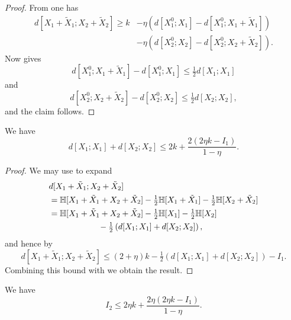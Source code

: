 \begin{proof}\leanok From  one has
\begin{align*}
    d[X_1+\tilde X_1; X_2+\tilde X_2] \geq k &- \eta(d[X^0_1;X_1] - d[X^0_1;X_1+\tilde X_1]) \\
    &- \eta(d[X^0_2;X_2] - d[X^0_2;X_2+\tilde X_2]).
\end{align*}
Now  gives
$$
d[X^0_1;X_1+\tilde X_1] - d[X^0_1;X_1] \leq \tfrac{1}{2} d[X_1;X_1]$$
and
$$
  d[X^0_2;X_2+\tilde X_2] - d[X^0_2;X_2] \leq \tfrac{1}{2} d[X_2;X_2],
$$
and the claim follows.
\end{proof}

\begin{lemma}\label{second-estimate-aux}\leanok
We have
\[d[X_1;X_1] + d[X_2;X_2] \leq 2 k + \frac{2(2 \eta k - I_1)}{1-\eta}. \]
\end{lemma}
\begin{proof}
\leanok
We may use  to expand
  \begin{align*}
   & d[X_1+\tilde X_1;X_2+\tilde X_2] \\ &= \mathbb{H}[X_1+\tilde X_1 + X_2 + \tilde X_2]  - \tfrac{1}{2} \mathbb{H}[X_1+\tilde X_1] - \tfrac{1}{2} \mathbb{H}[X_2+\tilde X_2] \\
    &= \mathbb{H}[X_1+\tilde X_1 + X_2 + \tilde X_2]  - \tfrac{1}{2} \mathbb{H}[X_1] - \tfrac{1}{2} \mathbb{H}[X_2]  \\ & \qquad\qquad\qquad   - \tfrac{1}{2} \left( d[X_1;X_1] + d[X_2; X_2] \right),
  \end{align*}
  and hence by 
  \[
    d[X_1+\tilde X_1; X_2+\tilde X_2] \leq (2+\eta) k - \tfrac{1}{2} \left( d[X_1;X_1] + d[X_2;X_2] \right) - I_1.
  \]
  Combining this bound with  we obtain
  the result.
\end{proof}

\begin{lemma}\label{second-estimate}
  \leanok
We have
$$ I_2 \leq 2 \eta k + \frac{2 \eta (2 \eta k - I_1)}{1 - \eta}.$$
\end{lemma}

